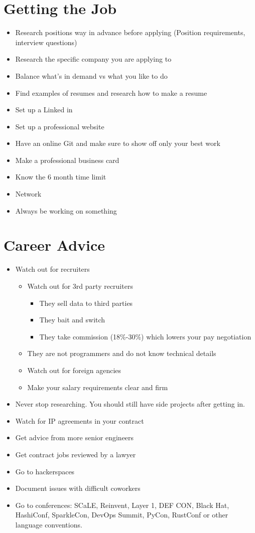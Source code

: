 \documentclass[12pt]{article}
\begin{document}
\section{Getting the Job}
\begin{itemize}
\item Research positions way in advance before applying (Position requirements, interview questions)
\item Research the specific company you are applying to
\item Balance what's in demand vs what you like to do
\item Find examples of resumes and research how to make a resume
\item Set up a Linked in
\item Set up a professional website
\item Have an online Git and make sure to show off only your best work
\item Make a professional business card
\item Know the 6 month time limit
\item Network
\item Always be working on something
\end{itemize}

\section{Career Advice}
\begin{itemize}
\item Watch out for recruiters
  \begin{itemize}
  \item Watch out for 3rd party recruiters
    \begin{itemize}
    \item They sell data to third parties
    \item They bait and switch
    \item They take commission (18\%-30\%) which lowers your pay negotiation
    \end{itemize}
  \item They are not programmers and do not know technical details
  \item Watch out for foreign agencies
  \item Make your salary requirements clear and firm
  \end{itemize}
\item Never stop researching. You should still have side projects after getting in.
\item Watch for IP agreements in your contract
\item Get advice from more senior engineers
\item Get contract jobs reviewed by a lawyer
\item Go to hackerspaces
\item Document issues with difficult coworkers
\item Go to conferences: SCaLE, Reinvent, Layer 1, DEF CON, Black Hat, HashiConf, SparkleCon, DevOps Summit, PyCon, RustConf or other language conventions.
\end{itemize}

\printbibliography
\end{document}
